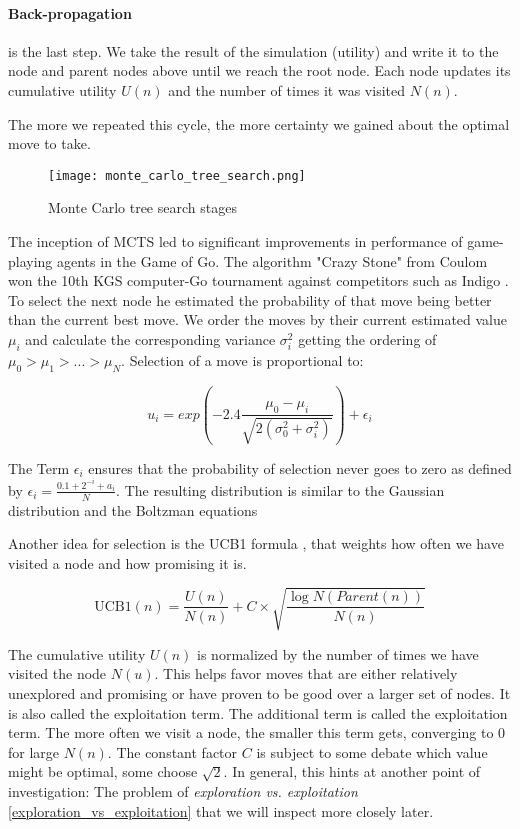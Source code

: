 \paragraph{Back-propagation} is the last step. We take the result of the simulation (utility) and write it to the node and parent nodes above until we reach the root node. Each node updates its cumulative utility $U(n)$ and the number of times it was visited $N(n)$.

The more we repeated this cycle, the more certainty we gained about the optimal move to take.

\begin{figure}
    \centering
    \texttt{[image: monte\_carlo\_tree\_search.png]}
    \caption{Monte Carlo tree search stages \cite{noauthor_fig_nodate}}
    \label{monte_carlo_tree_search}
\end{figure}

The inception of MCTS led to significant improvements in performance of game-playing agents in the Game of Go. The algorithm "Crazy Stone" from Coulom won the 10th KGS computer-Go tournament against competitors such as Indigo \cite{bouzy_associating_2006}. To select the next node he estimated the probability of that move being better than the current best move. We order the moves by their current estimated value $ \mu_i $ and calculate the corresponding variance $ \sigma_{i}^{2} $ getting the ordering of $ \mu_0 > \mu_1 > ... > \mu_N $. Selection of a move is proportional to:

$$
    u_i = exp\left(-2.4\frac{\mu_0 - \mu_i}{\sqrt{2(\sigma_{0}^{2} + \sigma_{i}^{2})}}\right) + \epsilon_i
$$

The Term $ \epsilon_i $ ensures that the probability of selection never goes to zero as defined by $ \epsilon_i = \frac{0.1 + 2^{-i} + a_i}{N} $. The resulting distribution is similar to the Gaussian distribution and the Boltzman equations \cite{coulom_efficient_2007}

Another idea for selection is the UCB1 formula \cite{auer_finite-time_nodate}, that weights how often we have visited a node and how promising it is.

$$
    \text{UCB1}(n) = \frac{U(n)}{N(n)} + C \times \sqrt{\frac{\log{N(Parent(n))}}{N(n)}}
$$

The cumulative utility $U(n)$ is normalized by the number of times we have visited the node $N(u)$. This helps favor moves that are either relatively unexplored and promising or have proven to be good over a larger set of nodes. It is also called the exploitation term. The additional term is called the exploitation term. The more often we visit a node, the smaller this term gets, converging to 0 for large $N(n)$. The constant factor $C$ is subject to some debate which value might be optimal, some choose $\sqrt{2}$. In general, this hints at another point of investigation: The problem of \textit{exploration vs. exploitation} \ref{exploration_vs_exploitation} that we will inspect more closely later.


